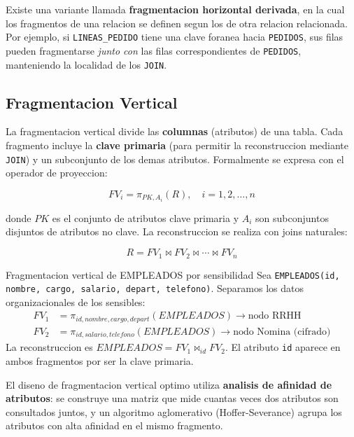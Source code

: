 \documentclass[11pt,a4paper]{article}
\begin{document}
Existe una variante llamada \textbf{fragmentacion horizontal derivada}, en la cual los fragmentos de una relacion se definen segun los de otra relacion relacionada. Por ejemplo, si \texttt{LINEAS\_PEDIDO} tiene una clave foranea hacia \texttt{PEDIDOS}, sus filas pueden fragmentarse \textit{junto con} las filas correspondientes de \texttt{PEDIDOS}, manteniendo la localidad de los \texttt{JOIN}.

\subsection{Fragmentacion Vertical}

La fragmentacion vertical divide las \textbf{columnas} (atributos) de una tabla. Cada fragmento incluye la \textbf{clave primaria} (para permitir la reconstruccion mediante \texttt{JOIN}) y un subconjunto de los demas atributos. Formalmente se expresa con el operador de proyeccion:

\begin{equation}
FV_i = \pi_{PK, A_i}(R), \quad i = 1, 2, \ldots, n
\end{equation}

donde $PK$ es el conjunto de atributos clave primaria y $A_i$ son subconjuntos disjuntos de atributos no clave. La reconstruccion se realiza con joins naturales:

\begin{equation}
R = FV_1 \bowtie FV_2 \bowtie \cdots \bowtie FV_n
\end{equation}

\begin{examplebox}{Fragmentacion vertical de EMPLEADOS por sensibilidad}
Sea \texttt{EMPLEADOS(id, nombre, cargo, salario, depart, telefono)}. Separamos los datos organizacionales de los sensibles:
\begin{align}
FV_1 &= \pi_{id, nombre, cargo, depart}(EMPLEADOS) \rightarrow \text{nodo RRHH}\\
FV_2 &= \pi_{id, salario, telefono}(EMPLEADOS) \rightarrow \text{nodo Nomina (cifrado)}
\end{align}
La reconstruccion es $EMPLEADOS = FV_1 \bowtie_{id} FV_2$. El atributo \texttt{id} aparece en ambos fragmentos por ser la clave primaria.
\end{examplebox}

El diseno de fragmentacion vertical optimo utiliza \textbf{analisis de afinidad de atributos}: se construye una matriz que mide cuantas veces dos atributos son consultados juntos, y un algoritmo aglomerativo (Hoffer-Severance) agrupa los atributos con alta afinidad en el mismo fragmento.
\end{document}
